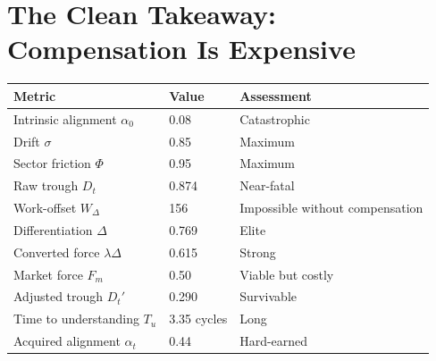 \documentclass[12pt, openany]{book}
\theoremstyle{thmstyle}
\theoremstyle{defstyle}
\begin{document}
\section{The Clean Takeaway: Compensation Is Expensive}

\begin{successbox}
\begin{center}
\begin{tabular}{lll}
\toprule
\textbf{Metric} & \textbf{Value} & \textbf{Assessment} \\
\midrule
Intrinsic alignment $\alpha_0$ & 0.08 & Catastrophic \\
Drift $\sigma$ & 0.85 & Maximum \\
Sector friction $\Phi$ & 0.95 & Maximum \\
Raw trough $D_t$ & 0.874 & Near-fatal \\
Work-offset $W_\Delta$ & 156 & Impossible without compensation \\
\midrule
Differentiation $\Delta$ & 0.769 & Elite \\
Converted force $\lambda\Delta$ & 0.615 & Strong \\
Market force $F_m$ & 0.50 & Viable but costly \\
Adjusted trough $D_t'$ & 0.290 & Survivable \\
Time to understanding $T_u$ & 3.35 cycles & Long \\
\midrule
Acquired alignment $\alpha_t$ & 0.44 & Hard-earned \\
\bottomrule
\end{tabular}
\end{center}
\end{successbox}
\end{document}
